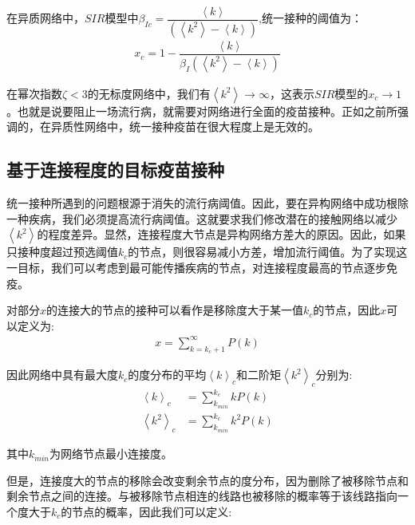 \documentclass[UTF8]{ctexart}
\begin{document}
\par 在异质网络中，$SIR$模型中$\beta_{Ic}=\dfrac{\left\langle k \right\rangle}{(\left\langle k^{2} \right\rangle-\left\langle k \right\rangle)}$,统一接种的阈值为：
\begin{equation}
	\begin{aligned}
		x_{c}=1-\dfrac{\left\langle k \right\rangle}{\beta_{I}(\left\langle k^{2} \right\rangle-\left\langle k \right\rangle)}
	\end{aligned}
\end{equation}
\par 在幂次指数$\zeta<3$的无标度网络中，我们有$\left\langle k^{2} \right\rangle\to \infty$，这表示$SIR$模型的$x_{c}\to1$。也就是说要阻止一场流行病，就需要对网络进行全面的疫苗接种。正如之前所强调的，在异质性网络中，统一接种疫苗在很大程度上是无效的。
\subsection{基于连接程度的目标疫苗接种}
统一接种所遇到的问题根源于消失的流行病阈值。因此，要在异构网络中成功根除一种疾病，我们必须提高流行病阈值。这就要求我们修改潜在的接触网络以减少$\left\langle k^{2} \right\rangle$的程度差异。显然，连接程度大节点是异构网络方差大的原因。因此，如果只接种度超过预选阈值$k_{c}$的节点，则很容易减小方差，增加流行阈值。为了实现这一目标，我们可以考虑到最可能传播疾病的节点，对连接程度最高的节点逐步免疫。
\par 对部分$x$的连接大的节点的接种可以看作是移除度大于某一值$k_{c}$的节点，因此$x$可以定义为:
\begin{equation}
	\begin{aligned}
		x=\sum\limits_{k=k_{c}+1}^{\infty}P(k)
	\end{aligned}
\end{equation}
\par 因此网络中具有最大度$k_{c}$的度分布的平均$\left\langle k \right\rangle_{c}$和二阶矩$\left\langle k^{2} \right\rangle_{c}$分别为:
\begin{equation}
	\begin{aligned}
		\left\langle k \right\rangle_{c}&=\sum\limits_{k_{min}}^{k_{c}}kP(k)\\
		\left\langle k^{2} \right\rangle_{c}&=\sum\limits_{k_{min}}^{k_{c}}k^{2}P(k)
	\end{aligned}
\end{equation}
\par 其中$k_{min}$为网络节点最小连接度。
\par 但是，连接度大的节点的移除会改变剩余节点的度分布，因为删除了被移除节点和剩余节点之间的连接。与被移除节点相连的线路也被移除的概率等于该线路指向一个度大于$k_{c}$的节点的概率，因此我们可以定义:
\end{document}
